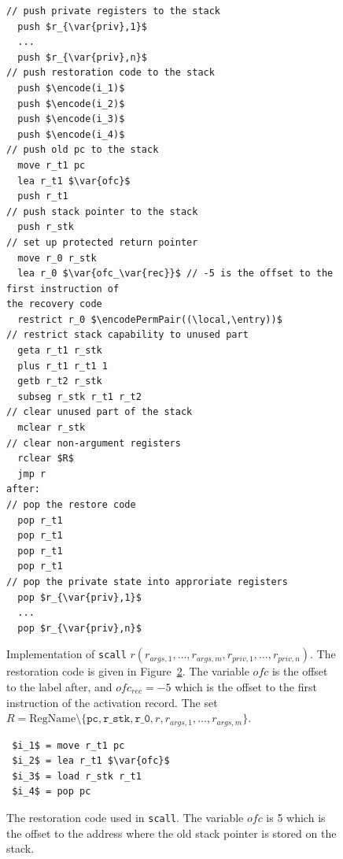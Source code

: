 \documentclass[format=acmsmall, review=true, screen=true]{acmart}
\renewcommand{\figurename}{Figure}
\newcommand{\var}[1]{\mathit{#1}}
\newcommand{\plainfun}[2]{
  \ifthenelse{\equal{#2}{}}
  {\mathit{#1}}
  {\mathit{#1}(#2)}
}
\newcommand{\encode}{\plainfun{encode}{}}
\newcommand{\encodePermPair}{\plainfun{encodePermPair}{}}
\newcommand{\plaindom}[1]{\mathrm{#1}}
\newcommand{\RegName}{\plaindom{RegName}}
\newcommand{\plainperm}[1]{\textsc{#1}}
\newcommand{\entry}{\plainperm{e}}
\newcommand{\plainlocality}[1]{\mathrm{#1}}
\newcommand{\local}{\plainlocality{local}}
\newenvironment{toplas}{}{}
\begin{document}
\begin{toplas}
\begin{figure}[htb]
  \begin{toplas}
    \centering
\begin{lstlisting}
// push private registers to the stack
  push $r_{\var{priv},1}$
  ...
  push $r_{\var{priv},n}$
// push restoration code to the stack
  push $\encode(i_1)$
  push $\encode(i_2)$
  push $\encode(i_3)$
  push $\encode(i_4)$
// push old pc to the stack
  move r_t1 pc
  lea r_t1 $\var{ofc}$ 
  push r_t1
// push stack pointer to the stack
  push r_stk
// set up protected return pointer
  move r_0 r_stk
  lea r_0 $\var{ofc_\var{rec}}$ // -5 is the offset to the first instruction of
the recovery code
  restrict r_0 $\encodePermPair((\local,\entry))$
// restrict stack capability to unused part
  geta r_t1 r_stk
  plus r_t1 r_t1 1
  getb r_t2 r_stk
  subseg r_stk r_t1 r_t2
// clear unused part of the stack
  mclear r_stk
// clear non-argument registers
  rclear $R$
  jmp r
after:
// pop the restore code
  pop r_t1
  pop r_t1
  pop r_t1
  pop r_t1
// pop the private state into approriate registers
  pop $r_{\var{priv},1}$
  ...
  pop $r_{\var{priv},n}$
\end{lstlisting}
    \caption{Implementation of \texttt{scall} $r(r_{\var{args},1},\dots,
      r_{\var{args},m},r_{\var{priv},1},\dots, r_{\var{priv},n})$. The
      restoration code is given in \figurename~\ref{fig:scall-rest-code}. The
      variable $\var{ofc}$ is the offset to the label after, and
      $\var{ofc_\var{rec}} = -5$ which is the offset to the first instruction of
      the activation record. The set $R = \RegName \setminus
      \{\texttt{pc},\texttt{r\_stk},\texttt{r\_0},r,r_{\var{args},1},\dots,r_{\var{args},m}\}$.}
    \label{fig:scall-impl}
  \end{toplas}

\end{figure}
\begin{figure}[htb]
  \begin{toplas}
    \centering
\begin{lstlisting}
 $i_1$ = move r_t1 pc
 $i_2$ = lea r_t1 $\var{ofc}$
 $i_3$ = load r_stk r_t1
 $i_4$ = pop pc
\end{lstlisting}
    \caption{The restoration code used in \texttt{scall}. The variable
      $\var{ofc}$ is 5 which is the offset to the address where the old stack
      pointer is stored on the stack.}
    \label{fig:scall-rest-code}
  \end{toplas}
\end{figure}


\end{toplas}
\end{document}
